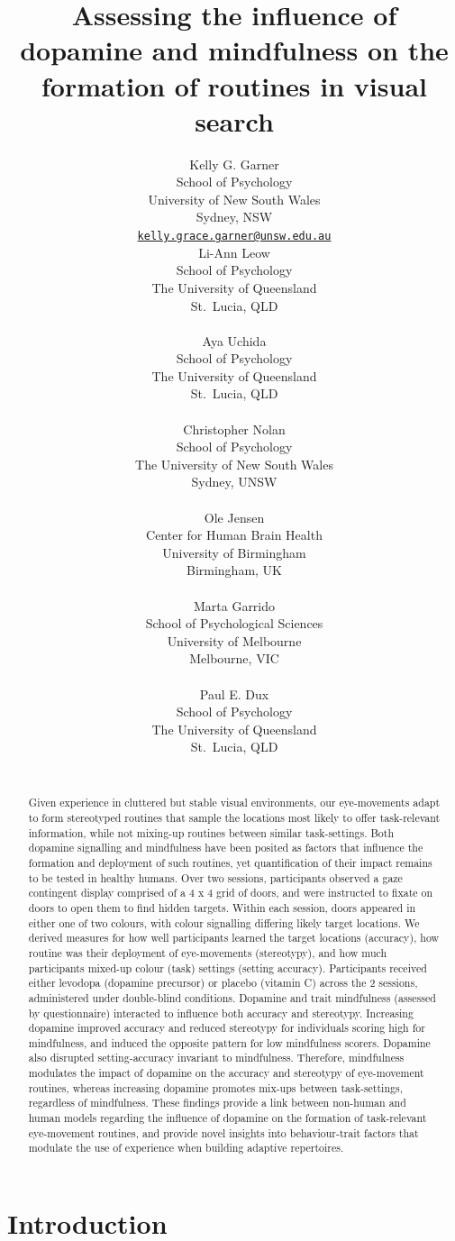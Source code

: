 \documentclass{article}
\title{Assessing the influence of dopamine and mindfulness on the
formation of routines in visual search}
\author{
    Kelly G. Garner
   \\
    School of Psychology \\
    University of New South Wales \\
  Sydney, NSW \\
  \texttt{\href{mailto:kelly.grace.garner@unsw.edu.au}{\nolinkurl{kelly.grace.garner@unsw.edu.au}}} \\
   \And
    Li-Ann Leow
   \\
    School of Psychology \\
    The University of Queensland \\
  St.~Lucia, QLD \\
  \texttt{} \\
   \And
    Aya Uchida
   \\
    School of Psychology \\
    The University of Queensland \\
  St.~Lucia, QLD \\
  \texttt{} \\
   \And
    Christopher Nolan
   \\
    School of Psychology \\
    The University of New South Wales \\
  Sydney, UNSW \\
  \texttt{} \\
   \And
    Ole Jensen
   \\
    Center for Human Brain Health \\
    University of Birmingham \\
  Birmingham, UK \\
  \texttt{} \\
   \And
    Marta Garrido
   \\
    School of Psychological Sciences \\
    University of Melbourne \\
  Melbourne, VIC \\
  \texttt{} \\
   \And
    Paul E. Dux
   \\
    School of Psychology \\
    The University of Queensland \\
  St.~Lucia, QLD \\
  \texttt{} \\
  }
\begin{document}
\maketitle


\begin{abstract}
Given experience in cluttered but stable visual environments, our
eye-movements adapt to form stereotyped routines that sample the
locations most likely to offer task-relevant information, while not
mixing-up routines between similar task-settings. Both dopamine
signalling and mindfulness have been posited as factors that influence
the formation and deployment of such routines, yet quantification of
their impact remains to be tested in healthy humans. Over two sessions,
participants observed a gaze contingent display comprised of a 4 x 4
grid of doors, and were instructed to fixate on doors to open them to
find hidden targets. Within each session, doors appeared in either one
of two colours, with colour signalling differing likely target
locations. We derived measures for how well participants learned the
target locations (accuracy), how routine was their deployment of
eye-movements (stereotypy), and how much participants mixed-up colour
(task) settings (setting accuracy). Participants received either
levodopa (dopamine precursor) or placebo (vitamin C) across the 2
sessions, administered under double-blind conditions. Dopamine and trait
mindfulness (assessed by questionnaire) interacted to influence both
accuracy and stereotypy. Increasing dopamine improved accuracy and
reduced stereotypy for individuals scoring high for mindfulness, and
induced the opposite pattern for low mindfulness scorers. Dopamine also
disrupted setting-accuracy invariant to mindfulness. Therefore,
mindfulness modulates the impact of dopamine on the accuracy and
stereotypy of eye-movement routines, whereas increasing dopamine
promotes mix-ups between task-settings, regardless of mindfulness. These
findings provide a link between non-human and human models regarding the
influence of dopamine on the formation of task-relevant eye-movement
routines, and provide novel insights into behaviour-trait factors that
modulate the use of experience when building adaptive repertoires.
\end{abstract}


\hypertarget{introduction}{%
\section{Introduction}\label{introduction}}
\end{document}

